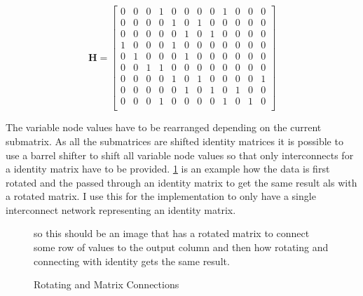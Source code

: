 \begin{equation}
	\bm{H} = \left[\begin{matrix}
		0 & 0 & 0 & 1 & 0 & 0 & 0 & 0 & 1 & 0 & 0 & 0 \\
		0 & 0 & 0 & 0 & 1 & 0 & 1 & 0 & 0 & 0 & 0 & 0 \\
		0 & 0 & 0 & 0 & 0 & 1 & 0 & 1 & 0 & 0 & 0 & 0 \\
		1 & 0 & 0 & 0 & 1 & 0 & 0 & 0 & 0 & 0 & 0 & 0 \\
		0 & 1 & 0 & 0 & 0 & 1 & 0 & 0 & 0 & 0 & 0 & 0 \\
		0 & 0 & 1 & 1 & 0 & 0 & 0 & 0 & 0 & 0 & 0 & 0 \\
		0 & 0 & 0 & 0 & 1 & 0 & 1 & 0 & 0 & 0 & 0 & 1 \\
		0 & 0 & 0 & 0 & 0 & 1 & 0 & 1 & 0 & 1 & 0 & 0 \\
		0 & 0 & 0 & 1 & 0 & 0 & 0 & 0 & 1 & 0 & 1 & 0 \\
    \end{matrix}\right] \label{ex_qc_mat}
\end{equation}

The variable node values have to be rearranged depending on the current submatrix. As all the submatrices are shifted identity matrices it is possible to use a barrel shifter to shift all variable node values so that only interconnects for a identity matrix have to be provided. \cref{rot_iden_same} is an example how the data is first rotated and the passed through an identity matrix to get the same result als with a rotated matrix. I use this for the implementation to only have a single interconnect network representing an identity matrix.

\begin{figure}
    so this should be an image that has a rotated matrix to connect some row of values to the output column and then how rotating and connecting with identity gets the same result.
    \centering
    \caption{Rotating and Matrix Connections}
    \label{rot_iden_same}
\end{figure}


